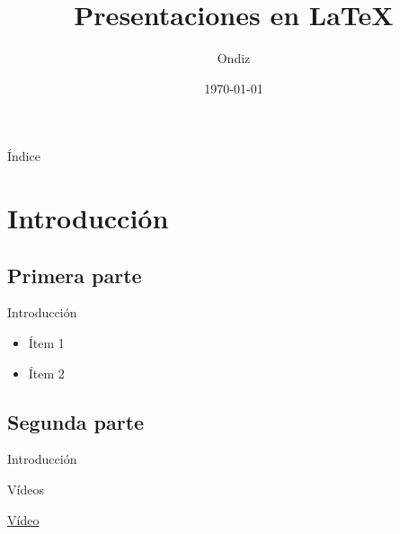 \documentclass{beamer}
\title{Presentaciones en \LaTeX}
\author{Ondiz}
\institute{Home, sweet home}
\date{\today}
\begin{document}
 
 \begin{frame}
  \maketitle
 \end{frame}
 
 \begin{frame}{Índice}
  \tableofcontents
 \end{frame}
 
 \section{Introducción}
 \subsection{Primera parte}

 \begin{frame}{Introducción}
  \begin{itemize}[<+->]
   \item Ítem 1
   \item Ítem 2
  \end{itemize}
 \end{frame}
 
 \subsection{Segunda parte}
 
   \begin{frame}{Introducción}
     \begin{block}{Vídeos}
      
      \href{run:popeye.mp4}{Vídeo}
     \end{block}

   \end{frame}
 
\end{document}
